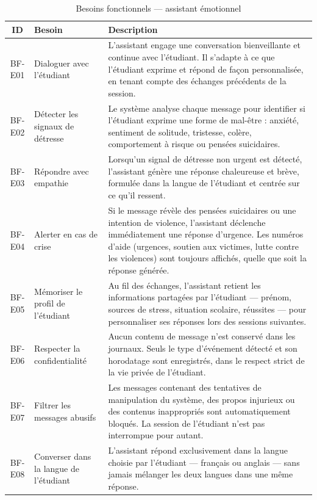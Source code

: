 \vspace{6pt}
\begin{table}[H]
\caption{Besoins fonctionnels — assistant émotionnel}
\label{tab:bf_emo}
\centering
\small
\setlength{\tabcolsep}{4pt}
\begin{tabular}{|c|p{3.5cm}|p{9.5cm}|}
\hline
\textbf{ID} & \textbf{Besoin} & \textbf{Description} \\
\hline
BF-E01 & Dialoguer avec l'étudiant
        & L'assistant engage une conversation bienveillante et continue avec l'étudiant. Il s'adapte à ce que l'étudiant exprime et répond de façon personnalisée, en tenant compte des échanges précédents de la session. \\
\hline
BF-E02 & Détecter les signaux de détresse
        & Le système analyse chaque message pour identifier si l'étudiant exprime une forme de mal-être : anxiété, sentiment de solitude, tristesse, colère, comportement à risque ou pensées suicidaires. \\
\hline
BF-E03 & Répondre avec empathie
        & Lorsqu'un signal de détresse non urgent est détecté, l'assistant génère une réponse chaleureuse et brève, formulée dans la langue de l'étudiant et centrée sur ce qu'il ressent. \\
\hline
BF-E04 & Alerter en cas de crise
        & Si le message révèle des pensées suicidaires ou une intention de violence, l'assistant déclenche immédiatement une réponse d'urgence. Les numéros d'aide (urgences, soutien aux victimes, lutte contre les violences) sont toujours affichés, quelle que soit la réponse générée. \\
\hline
BF-E05 & Mémoriser le profil de l'étudiant
        & Au fil des échanges, l'assistant retient les informations partagées par l'étudiant — prénom, sources de stress, situation scolaire, réussites — pour personnaliser ses réponses lors des sessions suivantes. \\
\hline
BF-E06 & Respecter la confidentialité
        & Aucun contenu de message n'est conservé dans les journaux. Seuls le type d'événement détecté et son horodatage sont enregistrés, dans le respect strict de la vie privée de l'étudiant. \\
\hline
BF-E07 & Filtrer les messages abusifs
        & Les messages contenant des tentatives de manipulation du système, des propos injurieux ou des contenus inappropriés sont automatiquement bloqués. La session de l'étudiant n'est pas interrompue pour autant. \\
\hline
BF-E08 & Converser dans la langue de l'étudiant
        & L'assistant répond exclusivement dans la langue choisie par l'étudiant — français ou anglais — sans jamais mélanger les deux langues dans une même réponse. \\
\hline
\end{tabular}
\end{table}

